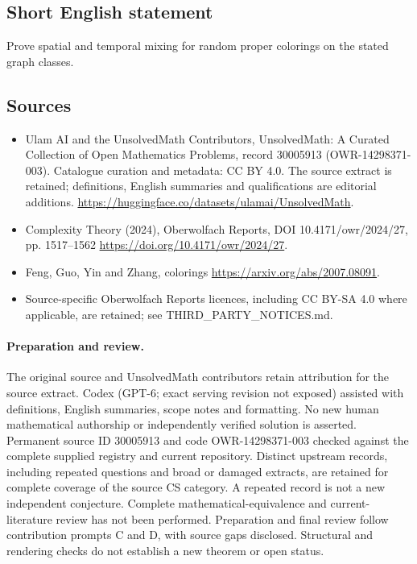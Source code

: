 \documentclass[11pt]{article}
\begin{document}
\subsection{Short English statement}
Prove spatial and temporal mixing for random proper colorings on the stated graph classes.
\subsection{Sources}
\begin{itemize}
\item[\hypertarget{source:30005913:1}{S1}] Ulam AI and the UnsolvedMath Contributors, UnsolvedMath: A Curated Collection of Open Mathematics Problems, record 30005913 (OWR-14298371-003). Catalogue curation and metadata: CC BY 4.0. The source extract is retained; definitions, English summaries and qualifications are editorial additions.
\url{https://huggingface.co/datasets/ulamai/UnsolvedMath}.
\item[\hypertarget{source:30005913:2}{S2}] Complexity Theory (2024), Oberwolfach Reports, DOI 10.4171/owr/2024/27, pp. 1517--1562
\url{https://doi.org/10.4171/owr/2024/27}.
\item[\hypertarget{source:30005913:3}{S3}] Feng, Guo, Yin and Zhang, colorings
\url{https://arxiv.org/abs/2007.08091}.
\item Source-specific Oberwolfach Reports licences, including CC BY-SA 4.0 where applicable, are retained; see THIRD\_PARTY\_NOTICES.md.
\end{itemize}
\paragraph{Preparation and review.}
The original source and UnsolvedMath contributors retain attribution for the source extract. Codex (GPT-6; exact serving revision not exposed) assisted with definitions, English summaries, scope notes and formatting. No new human mathematical authorship or independently verified solution is asserted. Permanent source ID 30005913 and code OWR-14298371-003 checked against the complete supplied registry and current repository. Distinct upstream records, including repeated questions and broad or damaged extracts, are retained for complete coverage of the source CS category. A repeated record is not a new independent conjecture. Complete mathematical-equivalence and current-literature review has not been performed. Preparation and final review follow contribution prompts C and D, with source gaps disclosed. Structural and rendering checks do not establish a new theorem or open status.
\label{end:30005913}
\end{document}
